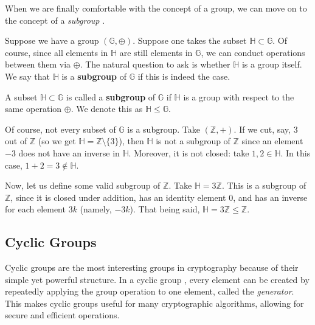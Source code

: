 \documentclass[../lecture-notes-148x210.tex]{subfiles}
\begin{document}
When we are finally comfortable with the concept of a group, we can move on to the concept of a \textit{subgroup} \cite[section 3]{Judson_2012}. 

Suppose we have a group $(\mathbb{G},\oplus)$. Suppose one takes the subset 
$\mathbb{H} \subset \mathbb{G}$. Of course, since all elements in $\mathbb{H}$ are still 
elements in $\mathbb{G}$, we can conduct operations between them via $\oplus$. 
The natural question to ask is whether $\mathbb{H}$ is a group itself. We say that 
$\mathbb{H}$ is a \textbf{subgroup} of $\mathbb{G}$ if this is indeed the case.

\begin{definition}
    A subset $\mathbb{H} \subset \mathbb{G}$ is called a \textbf{subgroup} of
    $\mathbb{G}$ if $\mathbb{H}$ is a group with respect to the same operation
    $\oplus$. 
    We denote this as $\mathbb{H} \leq \mathbb{G}$.
\end{definition}

\begin{example}
    Of course, not every subset of $\mathbb{G}$ is a subgroup. Take $(\mathbb{Z}, +)$. If we cut, say, $3$ out of 
    $\mathbb{Z}$ (so we get $\mathbb{H} = \mathbb{Z} \setminus \{3\}$), then $\mathbb{H}$ is not a subgroup of 
    $\mathbb{Z}$ since an element $-3$ does not have an inverse in $\mathbb{H}$. Moreover, it is not closed: 
    take $1,2 \in \mathbb{H}$. In this case, $1+2 = 3 \notin \mathbb{H}$.
\end{example}

\begin{example}
    Now, let us define some valid subgroup of $\mathbb{Z}$. Take $\mathbb{H} =
    3\mathbb{Z}$. This is a subgroup of $\mathbb{Z}$, since it is closed under
    addition, has an identity element $0$, and has an inverse for each element
    $3k$ (namely, $-3k$). That being said, $\mathbb{H} = 3\mathbb{Z} \leq \mathbb{Z}$.
\end{example}

\subsection{Cyclic Groups}

Cyclic groups are the most interesting groups in cryptography because of their
simple yet powerful structure. In a cyclic group \cite[section 4]{Judson_2012},
every element can be created by repeatedly applying the group operation to one
element, called the \emph{generator}. This makes cyclic groups useful for many
cryptographic algorithms, allowing for secure and efficient operations. 
\end{document}
